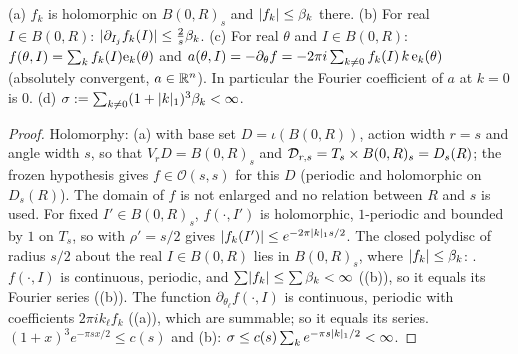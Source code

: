 \begin{lemma}[Coefficients]\label{bpN:p12:coef}
(a) $f_k$ is holomorphic on $B(0,R)_s$ and $\lvert f_k\rvert\le\beta_k$ there. (b) For real $I\in B(0,R)$: $\lvert \partial_{I_j}f_k(I)\rvert\le\frac2s\beta_k$. (c) For real $\theta$ and $I\in B(0,R)$: $f(\theta,I)=\sum_kf_k(I)\mathrm e_{k}(\theta)$ and $a(\theta,I)=-\partial_\theta f=-2\pi i\sum_{k\ne0}f_k(I)\,k\,\mathrm e_{k}(\theta)$ (absolutely convergent, $a\in\mathbb{R}^n$). In particular the Fourier coefficient of $a$ at $k=0$ is $0$. (d) $\sigma:=\sum_{k\ne0}(1+\lvert k\rvert_1)^3\beta_k<\infty$.
\end{lemma}
\begin{proof}
\label{stepN:p12:co-a} Holomorphy: (a) with base set $D=\iota(B(0,R))$, action width $r=s$ and angle width $s$, so that $V_rD=B(0,R)_s$ and $\mathcal D_{r,s}=T_s\times B(0,R)_s=D_s(R)$; the frozen hypothesis gives $f\in\mathcal O(s,s)$ for this $D$ (periodic and holomorphic on $D_s(R)$). The domain of $f$ is not enlarged and no relation between $R$ and $s$ is used. For fixed $I'\in B(0,R)_s$, $f(\cdot,I')$ is holomorphic, $1$-periodic and bounded by $1$ on $T_s$, so  with $\rho'=s/2$ gives $\lvert f_k(I')\rvert\le e^{-2\pi\lvert k\rvert_1s/2}$.
\label{stepN:p12:co-b} The closed polydisc of radius $s/2$ about the real $I\in B(0,R)$ lies in $B(0,R)_s$, where $\lvert f_k\rvert\le\beta_k$: .
\label{stepN:p12:co-c} $f(\cdot,I)$ is continuous, periodic, and $\sum\lvert f_k\rvert\le\sum\beta_k<\infty$ ((b)), so it equals its Fourier series ((b)). The function $\partial_{\theta_\ell}f(\cdot,I)$ is continuous, periodic with coefficients $2\pi ik_\ell f_k$ ((a)), which are summable; so it equals its series.
\label{stepN:p12:co-d} $(1+x)^3e^{-\pi sx/2}\le c(s)$ and (b): $\sigma\le c(s)\sum_ke^{-\pi s\lvert k\rvert_1/2}<\infty$.
\end{proof}

